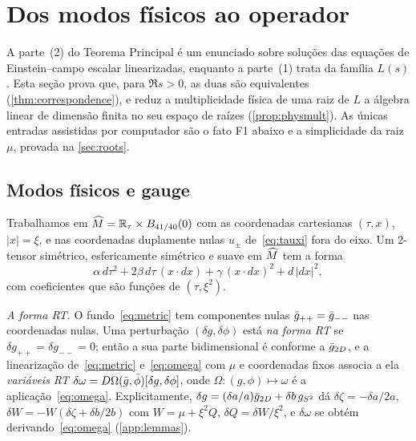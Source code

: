 \section{Dos modos físicos ao operador}\label{sec:physical}

A parte~(2) do Teorema Principal é um enunciado sobre soluções das equações de Einstein--campo escalar
linearizadas, enquanto a parte~(1) trata da família $L(s)$. Esta seção prova que, para $\Re s>0$, as duas são
equivalentes (\cref{thm:correspondence}), e reduz a multiplicidade física de uma raiz de $L$ a álgebra linear
de dimensão finita no seu espaço de raízes (\cref{prop:physmult}). As únicas entradas assistidas por computador são
o fato F1 abaixo e a simplicidade da raiz $\mu$, provada na \cref{sec:roots}.

\subsection{Modos físicos e gauge}\label{sec:physical-defs}

Trabalhamos em $\widehat M=\mathbb{R}_\tau\times B_{41/40}(0)$ com as coordenadas cartesianas $(\tau,x)$, $|x|=\xi$, e nas
coordenadas duplamente nulas $u_\pm$ de~\eqref{eq:tauxi} fora do eixo. Um 2-tensor simétrico, esfericamente
simétrico e suave em $\widehat M$ tem a forma
\begin{equation}\label{eq:invariant-tensor}
  \alpha\,d\tau^2+2\beta\,d\tau\,(x\cdot dx)+\gamma\,(x\cdot dx)^2+d\,|dx|^2,
\end{equation}
com coeficientes que são funções de $(\tau,\xi^2)$.

\emph{A forma RT.} O fundo~\eqref{eq:metric} tem componentes nulas $\bar g_{++}=\bar g_{--}$ nas
coordenadas nulas. Uma perturbação $(\delta g,\delta\phi)$ está \emph{na forma RT} se
$\delta g_{++}=\delta g_{--}=0$; então a sua parte bidimensional é conforme a $\bar g_{2D}$, e a
linearização de~\eqref{eq:metric} e~\eqref{eq:omega} com $\mu$ e coordenadas fixos associa a ela
\emph{variáveis RT} $\delta\omega=D\Omega(\bar g,\bar\phi)[\delta g,\delta\phi]$, onde
$\Omega:(g,\phi)\mapsto\omega$ é a aplicação~\eqref{eq:omega}. Explicitamente, $\delta g=(\delta a/a)\bar g_{2D}+\delta
b\,g_{S^2}$ dá $\delta\zeta=-\delta a/2a$, $\delta W=-W(\delta\zeta+\delta b/2b)$ com $W=\mu+\xi^2Q$,
$\delta Q=\delta W/\xi^2$, e $\delta\omega$ se obtém derivando~\eqref{eq:omega}
(\cref{app:lemmas}).

